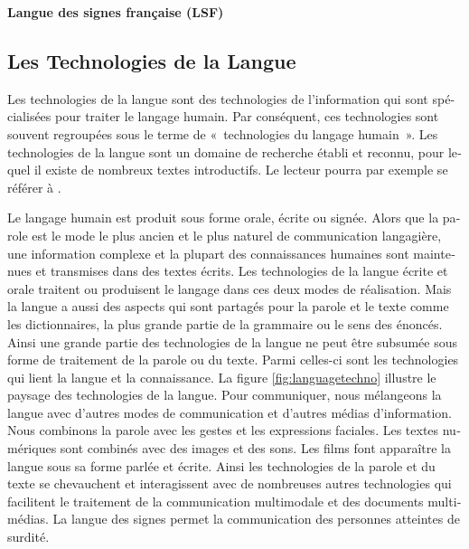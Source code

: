 \begin{french}
\begin{multicols}{2}
{\bf Langue des signes française (LSF)}\\

\end{multicols}

\clearpage


\begin{multicols}{2}

\subsection{Les Technologies de la Langue}

Les technologies de la langue sont des technologies de l'information
qui sont spécialisées pour traiter le langage humain. Par conséquent,
ces technologies sont souvent regroupées sous le terme de «~technologies
du langage humain~». Les technologies de la langue sont un domaine de recherche \'etabli et reconnu, pour lequel il existe de nombreux textes introductifs. Le lecteur pourra par exemple se r\'ef\'erer \`a \cite{hltsurvey96, varile1997survey}.

Le langage humain est produit sous forme orale,
écrite ou signée. Alors que la parole est le mode le plus ancien et le
plus naturel de communication langagière, une information complexe et
la plupart des connaissances humaines sont maintenues et transmises
dans des textes écrits. Les technologies de la langue écrite et orale
traitent ou produisent le langage dans ces deux modes de
réalisation. Mais la langue a aussi des aspects qui sont partagés pour
la parole et le texte comme les dictionnaires, la plus grande partie
de la grammaire ou le sens des énoncés. Ainsi une grande partie des
technologies de la langue ne peut être subsumée sous forme de
traitement de la parole ou du texte. Parmi celles-ci sont les
technologies qui lient la langue et la connaissance. La figure
\ref{fig:languagetechno} illustre le paysage des technologies de la
langue. Pour communiquer, nous mélangeons la langue avec d'autres
modes de communication et d'autres médias d'information. Nous
combinons la parole avec les gestes et les expressions faciales. Les
textes numériques sont combinés avec des images et des sons. Les films
font apparaître la langue sous sa forme parlée et écrite. Ainsi les
technologies de la parole et du texte se chevauchent et interagissent
avec de nombreuses autres technologies qui facilitent le traitement de
la communication multimodale et des documents multimédias.  La langue
des signes permet la communication des personnes atteintes de surdité.


\end{multicols}
\end{french}
